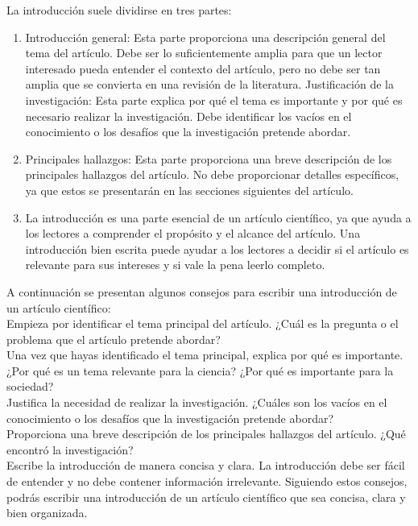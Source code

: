 \documentclass{article}
\begin{document}
La introducción suele dividirse en tres partes:\\
\begin{enumerate}
    \item Introducción general: Esta parte proporciona una descripción general del tema del artículo. Debe ser lo suficientemente amplia para que un lector interesado pueda entender el contexto del artículo, pero no debe ser tan amplia que se convierta en una revisión de la literatura.
Justificación de la investigación: Esta parte explica por qué el tema es importante y por qué es necesario realizar la investigación. Debe identificar los vacíos en el conocimiento o los desafíos que la investigación pretende abordar.
   \item Principales hallazgos: Esta parte proporciona una breve descripción de los principales hallazgos del artículo. No debe proporcionar detalles específicos, ya que estos se presentarán en las secciones siguientes del artículo.
   \item La introducción es una parte esencial de un artículo científico, ya que ayuda a los lectores a comprender el propósito y el alcance del artículo. Una introducción bien escrita puede ayudar a los lectores a decidir si el artículo es relevante para sus intereses y si vale la pena leerlo completo.
\end{enumerate}

A continuación se presentan algunos consejos para escribir una introducción de un artículo científico: \\

Empieza por identificar el tema principal del artículo. ¿Cuál es la pregunta o el problema que el artículo pretende abordar?\\
Una vez que hayas identificado el tema principal, explica por qué es importante. ¿Por qué es un tema relevante para la ciencia? ¿Por qué es importante para la sociedad?\\
Justifica la necesidad de realizar la investigación. ¿Cuáles son los vacíos en el conocimiento o los desafíos que la investigación pretende abordar?\\
Proporciona una breve descripción de los principales hallazgos del artículo. ¿Qué encontró la investigación?\\
Escribe la introducción de manera concisa y clara. La introducción debe ser fácil de entender y no debe contener información irrelevante.
\newline
Siguiendo estos consejos, podrás escribir una introducción de un artículo científico que sea concisa, clara y bien organizada.
\end{document}
